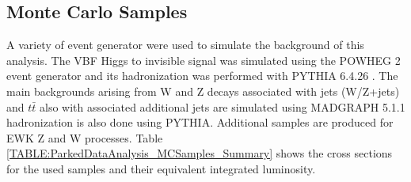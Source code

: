 \subsection{Monte Carlo Samples}


A variety of event generator were used to simulate the background of this analysis. The \gls{VBF} Higgs to invisible signal was simulated using the \textsc{POWHEG} 2 event generator \cite{ARTICLE:POWHEG_2004,ARTICLE:POWHEG_2007,ARTICLE:POWHEG_2009v1,ARTICLE:POWHEG_2009v2,ARTICLE:POWHEG_2010v1,ARTICLE:POWHEG_2010v2,ARTICLE:POWHEG_2011v1,ARTICLE:POWHEG_2011v2} and its hadronization was performed with \textsc{PYTHIA} 6.4.26 \cite{ARTICLE:Pythia6p4PhysicsAndManual}. The main backgrounds arising from W and Z decays associated with jets (W/Z+jets) and $t\bar{t}$ also with associated additional jets are simulated using \textsc{MADGRAPH} 5.1.1 \cite{ARTICLE:MadGraph5,ARTICLE:aMCatNLO} hadronization is also done using \textsc{PYTHIA}. Additional samples are produced for \gls{EWK} Z and W processes. Table \ref{TABLE:ParkedDataAnalysis_MCSamples_Summary} shows the cross sections for the used samples and their equivalent integrated luminosity.

